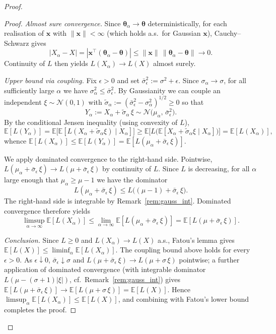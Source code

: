 \documentclass[11pt]{article}
\newcommand{\EE}{\mathbb{E}}
\newcommand{\NN}{\mathcal{N}}
\newcommand{\x}{\mathbf{x}}
\newcommand{\btheta}{\boldsymbol{\theta}}
\begin{document}
\begin{proof}
\begin{proof}
\emph{Almost sure convergence.}
Since $\btheta_\alpha\to\btheta$ deterministically,
for each realisation of $\x$ with $\|\x\|<\infty$
(which holds a.s.\ for Gaussian $\x$),
Cauchy--Schwarz gives
\[
|X_\alpha - X|
= |\x^\top(\btheta_\alpha - \btheta)|
\leq \|\x\|\,\|\btheta_\alpha - \btheta\| \to 0.
\]
Continuity of $L$ then yields
$L(X_\alpha)\to L(X)$ almost surely.

\emph{Upper bound via coupling.}
Fix $\epsilon>0$ and set
$\bar\sigma_\epsilon^2 := \sigma^2+\epsilon$.
Since $\sigma_\alpha\to\sigma$, for all sufficiently large
$\alpha$ we have $\sigma_\alpha^2\leq\bar\sigma_\epsilon^2$.
By Gaussianity we can couple an independent
$\xi\sim\NN(0,1)$ with
$\tilde\sigma_\alpha
:= (\bar\sigma_\epsilon^2-\sigma_\alpha^2)^{1/2}\geq 0$
so that
\[
Y_\alpha := X_\alpha + \tilde\sigma_\alpha\,\xi
\sim\NN\!\bigl(\mu_\alpha,\,\bar\sigma_\epsilon^2\bigr).
\]
By the conditional Jensen inequality (using convexity of $L$),
\[
\EE[L(Y_\alpha)]
= \EE\bigl[\EE[L(X_\alpha+\tilde\sigma_\alpha\xi)\mid X_\alpha]\bigr]
\geq \EE\bigl[L\bigl(
  \EE[X_\alpha+\tilde\sigma_\alpha\xi\mid X_\alpha]\bigr)\bigr]
= \EE[L(X_\alpha)],
\]
whence
$\EE[L(X_\alpha)]
\leq \EE[L(Y_\alpha)]
= \EE[L(\mu_\alpha+\bar\sigma_\epsilon\,\xi)]$.

We apply dominated convergence to the right-hand side.
Pointwise, $L(\mu_\alpha+\bar\sigma_\epsilon\,\xi)
\to L(\mu+\bar\sigma_\epsilon\,\xi)$ by continuity of $L$.
Since $L$ is decreasing, for all $\alpha$ large enough that
$\mu_\alpha\geq\mu-1$ we have the dominator
\[
L(\mu_\alpha+\bar\sigma_\epsilon\,\xi)
\leq L\bigl((\mu-1)+\bar\sigma_\epsilon\,\xi\bigr).
\]
The right-hand side is integrable by
Remark~\ref{rem:gauss_int}.
Dominated convergence therefore yields
\[
\limsup_{\alpha\to\infty}\EE[L(X_\alpha)]
\leq
\lim_{\alpha\to\infty}\EE[L(\mu_\alpha+\bar\sigma_\epsilon\,\xi)]
= \EE[L(\mu+\bar\sigma_\epsilon\,\xi)].
\]

\emph{Conclusion.}
Since $L\geq 0$ and $L(X_\alpha)\to L(X)$ a.s., Fatou's lemma
gives
$\EE[L(X)]\leq\liminf_\alpha\EE[L(X_\alpha)]$.
The coupling bound above holds for every $\epsilon>0$.
As $\epsilon\downarrow 0$, $\bar\sigma_\epsilon\downarrow\sigma$
and $L(\mu+\bar\sigma_\epsilon\,\xi)\to L(\mu+\sigma\,\xi)$
pointwise; a further application of dominated convergence
(with integrable dominator $L(\mu-(\sigma{+}1)|\xi|)$,
cf.\ Remark~\ref{rem:gauss_int}) gives
$\EE[L(\mu+\bar\sigma_\epsilon\,\xi)]
\to\EE[L(\mu+\sigma\,\xi)]=\EE[L(X)]$.
Hence $\limsup_\alpha\EE[L(X_\alpha)]\leq\EE[L(X)]$,
and combining with Fatou's lower bound completes the proof.
\end{proof}


\end{proof}
\end{document}
